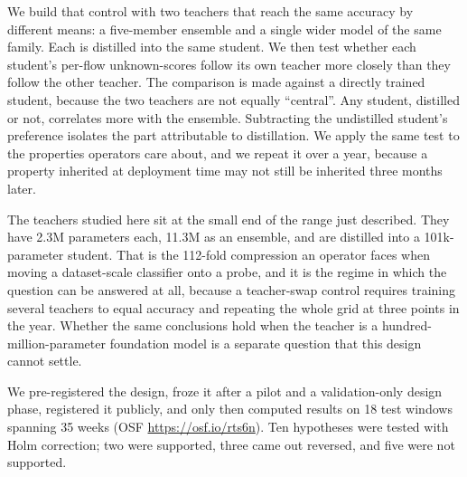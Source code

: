 \documentclass[journal]{IEEEtran}
\begin{document}
We build that control with two teachers that reach the same accuracy by different means: a five-member ensemble and a single wider model of the same family. Each is distilled into the same student. We then test whether each student's per-flow unknown-scores follow its own teacher more closely than they follow the other teacher. The comparison is made against a directly trained student, because the two teachers are not equally ``central''. Any student, distilled or not, correlates more with the ensemble. Subtracting the undistilled student's preference isolates the part attributable to distillation. We apply the same test to the properties operators care about, and we repeat it over a year, because a property inherited at deployment time may not still be inherited three months later.

The teachers studied here sit at the small end of the range just described. They have 2.3M parameters each, 11.3M as an ensemble, and are distilled into a 101k-parameter student. That is the 112-fold compression an operator faces when moving a dataset-scale classifier onto a probe, and it is the regime in which the question can be answered at all, because a teacher-swap control requires training several teachers to equal accuracy and repeating the whole grid at three points in the year. Whether the same conclusions hold when the teacher is a hundred-million-parameter foundation model is a separate question that this design cannot settle.

We pre-registered the design, froze it after a pilot and a validation-only design phase, registered it publicly, and only then computed results on 18 test windows spanning 35 weeks (OSF \url{https://osf.io/rts6n}). Ten hypotheses were tested with Holm correction; two were supported, three came out reversed, and five were not supported.
\end{document}
